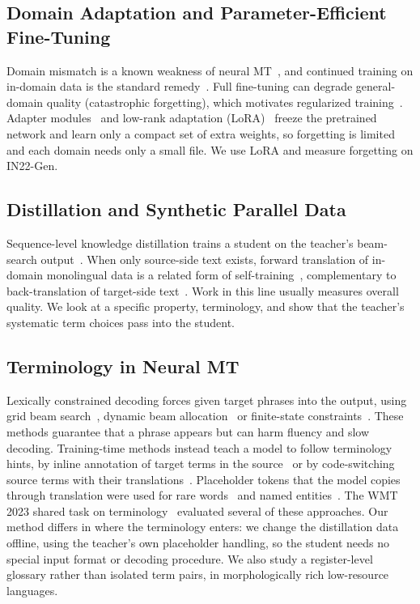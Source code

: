 \documentclass[conference]{IEEEtran}
\begin{document}
\subsection{Domain Adaptation and Parameter-Efficient Fine-Tuning}
Domain mismatch is a known weakness of neural MT~\cite{koehn2017six}, and continued training on in-domain data is the standard remedy~\cite{luong2015stanford,freitag2016fast,chu2018survey,saunders2022domain}. Full fine-tuning can degrade general-domain quality (catastrophic forgetting), which motivates regularized training~\cite{thompson2019overcoming}. Adapter modules~\cite{houlsby2019parameter,bapna2019simple} and low-rank adaptation (LoRA)~\cite{hu2022lora} freeze the pretrained network and learn only a compact set of extra weights, so forgetting is limited and each domain needs only a small file. We use LoRA and measure forgetting on IN22-Gen.

\subsection{Distillation and Synthetic Parallel Data}
Sequence-level knowledge distillation trains a student on the teacher's beam-search output~\cite{kim2016sequence}. When only source-side text exists, forward translation of in-domain monolingual data is a related form of self-training~\cite{zhang2016exploiting}, complementary to back-translation of target-side text~\cite{sennrich2016improving}. Work in this line usually measures overall quality. We look at a specific property, terminology, and show that the teacher's systematic term choices pass into the student.

\subsection{Terminology in Neural MT}
Lexically constrained decoding forces given target phrases into the output, using grid beam search~\cite{hokamp2017lexically}, dynamic beam allocation~\cite{post2018fast,hu2019improved} or finite-state constraints~\cite{hasler2018neural}. These methods guarantee that a phrase appears but can harm fluency and slow decoding. Training-time methods instead teach a model to follow terminology hints, by inline annotation of target terms in the source~\cite{dinu2019training} or by code-switching source terms with their translations~\cite{song2019code}. Placeholder tokens that the model copies through translation were used for rare words~\cite{luong2015addressing} and named entities~\cite{crego2016systran}. The WMT 2023 shared task on terminology~\cite{semenov2023findings} evaluated several of these approaches. Our method differs in where the terminology enters: we change the distillation data offline, using the teacher's own placeholder handling, so the student needs no special input format or decoding procedure. We also study a register-level glossary rather than isolated term pairs, in morphologically rich low-resource languages.
\end{document}
